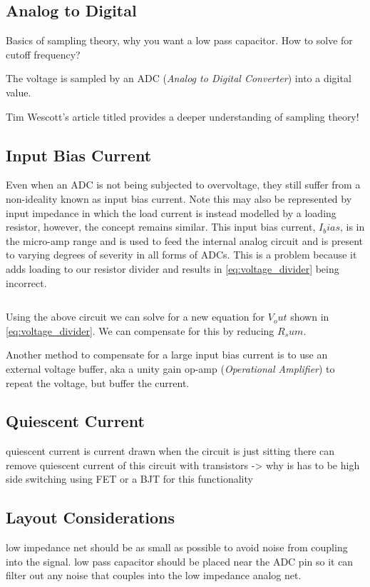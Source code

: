 \documentclass[main.tex]{subfiles}
\begin{document}
\subsection{Analog to Digital}

Basics of sampling theory, why you want a low pass capacitor. How to solve for cutoff frequency? 

The voltage is sampled by an ADC (\textit{Analog to Digital Converter}) into a digital value. 

Tim Wescott's article titled  provides a deeper understanding of sampling theory! 

\subsection{Input Bias Current}
Even when an ADC is not being subjected to overvoltage, they still suffer from a non-ideality known as input bias current. Note this may also be represented by input impedance in which the load current is instead modelled by a loading resistor, however, the concept remains similar. This input bias current, $I_bias$, is in the micro-amp range and is used to feed the internal analog circuit and is present to varying degrees of severity in all forms of ADCs. This is a problem because it adds loading to our resistor divider and results in \eqref{eq:voltage_divider} being incorrect. 


\begin{equation}
    \label{eq:loaded_voltage_divider}
\end{equation} 

Using the above circuit we can solve for a new equation for $V_out$ shown in \eqref{eq:voltage_divider}. We can compensate for this by reducing $R_sum$. 

Another method to compensate for a large input bias current is to use an external voltage buffer, aka a unity gain op-amp (\textit{Operational Amplifier}) to repeat the voltage, but buffer the current. 



\subsection{Quiescent Current}
quiescent current is current drawn when the circuit is just sitting there
can remove quiescent current of this circuit with transistors -> why is has to be high side switching
using FET or a BJT for this functionality

\subsection{Layout Considerations}
low impedance net should be as small as possible to avoid noise from coupling into the signal. 
low pass capacitor should be placed near the ADC pin so it can filter out any noise that couples into the low impedance analog net. 
\end{document}
